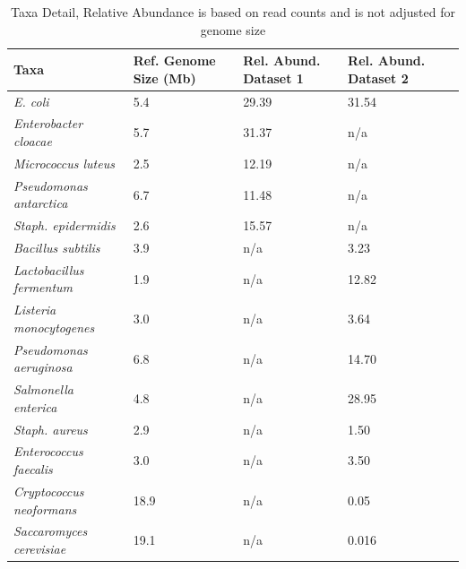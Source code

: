 \begin{table}[]
\centering
\caption{Taxa Detail, \small{Relative Abundance is based on read counts and is not adjusted for genome size}}
\label{taxaabunds}
\begin{tabular}{|l|l|l|l|l|}
\hline
Taxa                             & Ref. Genome Size (Mb) & Rel. Abund. Dataset 1 & Rel. Abund. Dataset 2  \\ \hline \hline
\textit{E. coli}                 & 5.4                        & 29.39                 & 31.54                   \\
\textit{Enterobacter cloacae}    & 5.7                        & 31.37                 & n/a                    \\
\textit{Micrococcus luteus}      & 2.5                        & 12.19                 & n/a                    \\
\textit{Pseudomonas antarctica}  & 6.7                        & 11.48                 & n/a                    \\
\textit{Staph. epidermidis}      & 2.6                        & 15.57                 & n/a                    \\
\textit{Bacillus subtilis}       & 3.9                        & n/a                   & 3.23                   \\
\textit{Lactobacillus fermentum} & 1.9                        & n/a                   & 12.82                  \\
\textit{Listeria monocytogenes}  & 3.0                        & n/a                   & 3.64                  \\
\textit{Pseudomonas aeruginosa}  & 6.8                        & n/a                   & 14.70                   \\
\textit{Salmonella enterica}     & 4.8                        & n/a                   & 28.95                   \\
\textit{Staph. aureus}           & 2.9                        & n/a                   & 1.50                   \\
\textit{Enterococcus faecalis}   & 3.0                        & n/a                   & 3.50                   \\
  
\textit{Cryptococcus neoformans} & 18.9                       & n/a                   & 0.05                 \\
\textit{Saccaromyces cerevisiae} & 19.1                       & n/a                   & 0.016                  \\ \hline            
\end{tabular}

\end{table}

